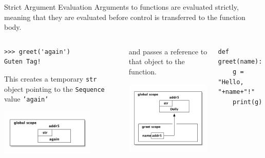 \documentclass[smaller, aspectratio=1610]{beamer}
\begin{document}
\begin{frame}[label={sec:org5be5366},fragile]{Strict Argument Evaluation}
 Arguments to functions are evaluated strictly, meaning that they are evaluated before control is transferred to the function body.

\begin{columns}
\begin{column}{0.3\columnwidth}
\begin{block}{}
\lstset{language=Python,label= ,caption= ,captionpos=b,numbers=none}
\begin{lstlisting}
>>> greet('again')
Guten Tag!
\end{lstlisting}

This creates a temporary \texttt{str} object pointing to the \texttt{Sequence} value \texttt{'again'}

\begin{center}
\includegraphics[width=1.75in]{diagrams/again.png}
\end{center}
\end{block}
\end{column}

\begin{column}{0.3\columnwidth}
\begin{block}{}
and passes a reference to that object to the function.

\begin{center}
\includegraphics[width=1.75in]{diagrams/greet-again.png}
\end{center}
\end{block}
\end{column}


\begin{column}{0.3\columnwidth}
\begin{block}{}
\lstset{language=Python,label= ,caption= ,captionpos=b,numbers=none,basicstyle=\ttfamily\scriptsize, numbers=left}
\begin{lstlisting}
def greet(name):
    g = "Hello, "+name+"!"
    print(g)
\end{lstlisting}


\end{block}
\end{column}
\end{columns}
\end{frame}
\end{document}
